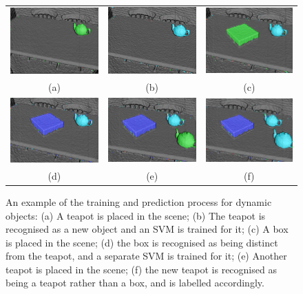 \begin{figure}[!htbp]
~\label{fig:moseg_recognition}
  \centering
  \begin{tabular}{ccc}
    \includegraphics[width=.28\linewidth]{figures/moseg/objects1.png} &
    \includegraphics[width=.28\linewidth]{figures/moseg/objects2.png} &
    \includegraphics[width=.28\linewidth]{figures/moseg/objects3.png} \\ 
    (a) & (b) & (c) \\
    \includegraphics[width=.28\linewidth]{figures/moseg/objects4.png} &
    \includegraphics[width=.28\linewidth]{figures/moseg/objects5.png} &
    \includegraphics[width=.28\linewidth]{figures/moseg/objects6.png} \\ 
    (d) & (e) & (f) \\
  \end{tabular}
  \caption[Motion Segmentation Object Recognition]
  {An example of the training and prediction process for dynamic
    objects:
    (a) A teapot is placed in the scene;
    (b) The teapot is recognised as a new object and an SVM is trained for it;
    (c) A box is placed in the scene; (d) the box is recognised as being
    distinct from the teapot, and a separate SVM is trained for it;
    (e) Another teapot is placed in the scene; (f) the new teapot is recognised
    as being a teapot rather than a box, and is labelled accordingly.}
\end{figure}
